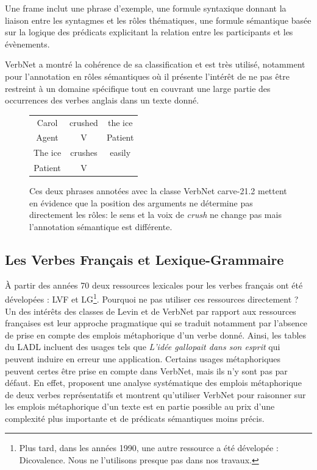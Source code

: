 Une frame inclut une phrase d'exemple, une formule syntaxique donnant la
liaison entre les syntagmes et les rôles thématiques, une formule sémantique
basée sur la logique des prédicats explicitant la relation entre les
participants et les évènements.



 VerbNet a montré la cohérence de sa classification et est très
utilisé, notamment pour l'annotation en rôles sémantiques
\citep{swier2005exploiting,palmer2013semantic} où il présente l'intérêt de ne
pas être restreint à un domaine spécifique tout en couvrant une large partie
des occurrences des verbes anglais dans un texte donné.

\begin{figure}[ht]
    \centering
    \begin{tabular}{ccc}
        \toprule
        Carol & crushed   & the ice \\
        Agent & V         & Patient \\
        \midrule
        The ice & crushes & easily  \\
        Patient & V       &         \\
        \bottomrule
    \end{tabular}
    \caption{\label{fig:example_srl}Ces deux phrases annotées avec la classe VerbNet carve-21.2 mettent en évidence que la position des arguments ne détermine pas directement les rôles: le sens et la voix de \textit{crush} ne change pas mais l'annotation sémantique est différente.}
\end{figure}

\subsection{Les Verbes Français et Lexique-Grammaire}

À partir des années 70 deux ressources lexicales pour les verbes français ont
été dévelopées : LVF et LG\footnote{Plus tard, dans les années 1990, une autre
ressource a été dévelopée : Dicovalence. Nous ne l'utilisons presque pas dans
nos travaux.}. Pourquoi ne pas utiliser ces ressources directement ? Un des
intérêts des classes de Levin et de VerbNet par rapport aux ressources
françaises est leur approche pragmatique qui se traduit notamment par l'absence
de prise en compte des emplois métaphorique d'un verbe donné. Ainsi, les tables
du LADL incluent des usages tels que \textit{L'idée gallopait dans son esprit}
qui peuvent induire en erreur une application. Certains usages métaphoriques
peuvent certes être prise en compte dans VerbNet, mais ils n'y sont pas par
défaut. En effet, \cite{brown2012semantic} proposent une analyse systématique
des emplois métaphorique de deux verbes représentatifs et montrent qu'utiliser
VerbNet pour raisonner sur les emplois métaphorique d'un texte est en partie
possible au prix d'une complexité plus importante et de prédicats sémantiques
moins précis.

